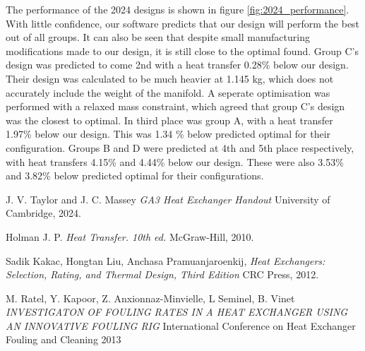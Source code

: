 \documentclass{article}
\begin{document}
The performance of the 2024 designs is shown in figure \ref{fig:2024_performance}.
With little confidence, our software predicts that our design will perform the best out of all groups.
It can also be seen that despite small manufacturing modifications made to our design, it is still close to the optimal found.
Group C's design was predicted to come 2nd with a heat transfer 0.28\% below our design.
Their design was calculated to be much heavier at 1.145 kg, which does not accurately include the weight of the manifold.
A seperate optimisation was performed with a relaxed mass constraint, which agreed that group C's design was the closest to optimal.
In third place was group A, with a heat transfer 1.97\% below our design. This was 1.34 \% below predicted optimal for their configuration.
Groups B and D were predicted at 4th and 5th place respectively, with heat transfers 4.15\% and 4.44\% below our design.
These were also 3.53\% and 3.82\% below predicted optimal for their configurations.

\begin{thebibliography}{9}

    
      J. V. Taylor and J. C. Massey
      \emph{GA3 Heat Exchanger Handout}
      University of Cambridge,
      2024.
    
      Holman J. P.
      \emph{Heat Transfer. 10th ed.}
      McGraw-Hill,
      2010.

        Sadik Kakac, Hongtan Liu, Anchasa Pramuanjaroenkij,
        \emph{Heat Exchangers: Selection, Rating, and Thermal Design, Third Edition}
        CRC Press,
        2012.

      M. Ratel, Y. Kapoor, Z. Anxionnaz-Minvielle, L Seminel, B. Vinet
      \emph{INVESTIGATON OF FOULING RATES IN A HEAT EXCHANGER USING AN INNOVATIVE FOULING RIG}
      International Conference on Heat Exchanger Fouling and Cleaning
      2013

\end{thebibliography}
\end{document}
